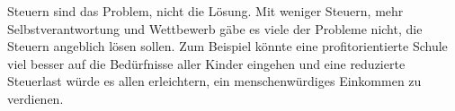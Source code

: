 Steuern sind das Problem, nicht die Lösung.
Mit weniger Steuern, mehr Selbstverantwortung und Wettbewerb gäbe es viele der Probleme nicht, die Steuern angeblich lösen sollen.
Zum Beispiel könnte eine profitorientierte Schule viel besser auf die Bedürfnisse aller Kinder eingehen und eine reduzierte Steuerlast würde es allen erleichtern, ein menschenwürdiges Einkommen zu verdienen.
